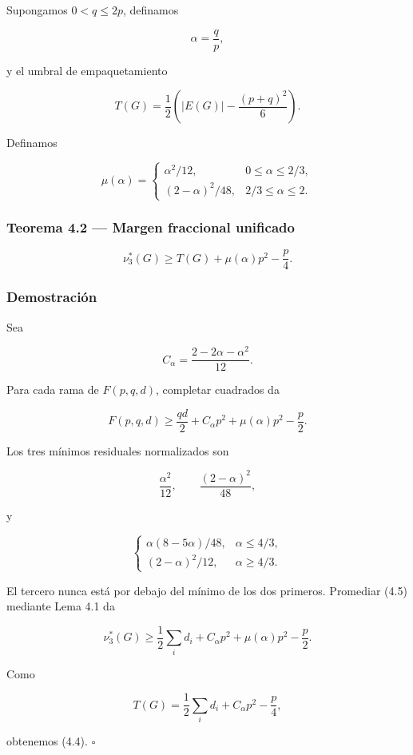 \documentclass[
  11pt,
]{article}
\begin{document}
Supongamos \(0<q\le2p\), definamos

\[
\alpha=\frac qp,
\]

y el umbral de empaquetamiento

\[
T(G)=\frac12\left(|E(G)|-\frac{(p+q)^2}{6}\right).
\tag{4.2}
\]

Definamos

\[
\mu(\alpha)
=
\begin{cases}
\alpha^2/12,&0\le\alpha\le2/3,\\
(2-\alpha)^2/48,&2/3\le\alpha\le2.
\end{cases}
\tag{4.3}
\]

\subsubsection{Teorema 4.2 --- Margen fraccional unificado}\label{teorema-4.2-margen-fraccional-unificado}

\[
\boxed{
\nu_3^*(G)
\ge
T(G)+\mu(\alpha)p^2-\frac p4.
}
\tag{4.4}
\]

\subsubsection{Demostración}\label{demostraciuxf3n-2}

Sea

\[
C_\alpha=\frac{2-2\alpha-\alpha^2}{12}.
\]

Para cada rama de \(F(p,q,d)\), completar cuadrados da

\[
F(p,q,d)
\ge
\frac{qd}{2}+C_\alpha p^2+\mu(\alpha)p^2-\frac p2.
\tag{4.5}
\]

Los tres mínimos residuales normalizados son

\[
\frac{\alpha^2}{12},
\qquad
\frac{(2-\alpha)^2}{48},
\]

y

\[
\begin{cases}
\alpha(8-5\alpha)/48,&\alpha\le4/3,\\
(2-\alpha)^2/12,&\alpha\ge4/3.
\end{cases}
\]

El tercero nunca está por debajo del mínimo de los dos primeros. Promediar (4.5) mediante Lema 4.1 da

\[
\nu_3^*(G)
\ge
\frac12\sum_i d_i+C_\alpha p^2+\mu(\alpha)p^2-\frac p2.
\]

Como

\[
T(G)=\frac12\sum_i d_i+C_\alpha p^2-\frac p4,
\]

obtenemos (4.4). \(\square\)
\end{document}
